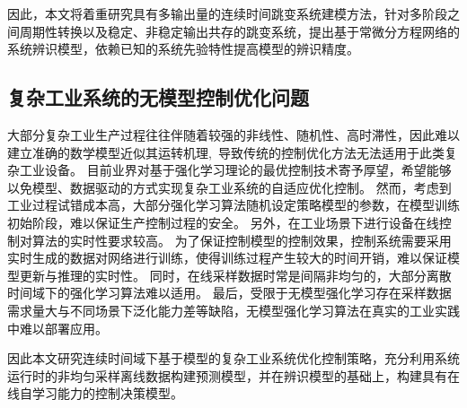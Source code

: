因此，本文将着重研究具有多输出量的连续时间跳变系统建模方法，针对多阶段之间周期性转换以及稳定、非稳定输出共存的跳变系统，提出基于常微分方程网络的系统辨识模型，依赖已知的系统先验特性提高模型的辨识精度。

\subsection{复杂工业系统的无模型控制优化问题}
大部分复杂工业生产过程往往伴随着较强的非线性、随机性、高时滞性，因此难以建立准确的数学模型近似其运转机理, 导致传统的控制优化方法无法适用于此类复杂工业设备。
目前业界对基于强化学习理论的最优控制技术\cite{Sutton2018,F.L.LewisD.Vrabie2012}寄予厚望，希望能够以免模型、数据驱动的方式实现复杂工业系统的自适应优化控制。
然而，考虑到工业过程试错成本高，大部分强化学习算法随机设定策略模型的参数，在模型训练初始阶段，难以保证生产控制过程的安全。
另外，在工业场景下进行设备在线控制对算法的实时性要求较高。
为了保证控制模型的控制效果，控制系统需要采用实时生成的数据对网络进行训练，使得训练过程产生较大的时间开销，难以保证模型更新与推理的实时性。
同时，在线采样数据时常是间隔非均匀的，大部分离散时间域下的强化学习算法难以适用。
最后，受限于无模型强化学习存在采样数据需求量大与不同场景下泛化能力差等缺陷，无模型强化学习算法在真实的工业实践中难以部署应用。

因此本文研究连续时间域下基于模型的复杂工业系统优化控制策略，充分利用系统运行时的非均匀采样离线数据构建预测模型，并在辨识模型的基础上，构建具有在线自学习能力的控制决策模型。


